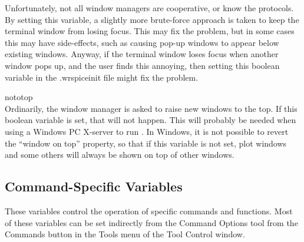 \begin{description}
Unfortunately, not all window managers are cooperative, or know the
protocols.  By setting this variable, a slightly more brute-force
approach is taken to keep the terminal window from losing focus.  This
may fix the problem, but in some cases this may have side-effects,
such as causing pop-up windows to appear below existing windows. 
Anyway, if the terminal window loses focus when another window pops
up, and the user finds this annoying, then setting this boolean
variable in the {\vt .wrspiceinit} file might fix the problem.

\item{\et nototop}\\
Ordinarily, the window manager is asked to raise new windows to the
top.  If this boolean variable is set, that will not happen.  This
will probably be needed when using a Windows PC X-server to run
{\WRspice}.  In Windows, it is not possible to revert the ``window on
top'' property, so that if this variable is not set, plot windows and
some others will always be shown on top of other windows.

\end{description}

\subsection{Command-Specific Variables}


These variables control the operation of specific {\WRspice} commands
and functions.  Most of these variables can be set indirectly from the
{\cb Command Options} tool from the {\cb Commands} button in the {\cb
Tools} menu of the {\cb Tool Control} window.

